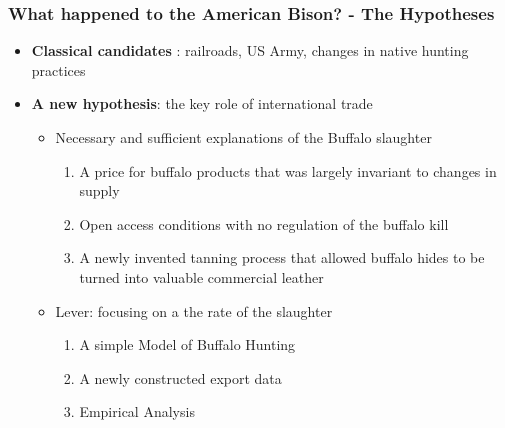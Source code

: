 \documentclass[aspectratio=169, 12pt, final]{beamer}
\begin{document}
\begin{frame}
\frametitle{What happened to the American Bison? - The Hypotheses}	
\begin{itemize}
	\item \textbf{Classical candidates} : railroads, US Army, changes in native hunting practices
\item \textbf{A new hypothesis}: the key role of international trade
\begin{itemize}
	\item Necessary and sufficient explanations of the Buffalo slaughter
	\begin{enumerate}
		\item A price for buffalo products that was largely invariant to changes in supply
		\item Open access conditions with no regulation of the buffalo kill
		\item A newly invented tanning process that allowed buffalo hides to be turned into valuable commercial leather
	\end{enumerate}
	\item Lever: focusing on a the rate of the slaughter
	\begin{enumerate}
		\item A simple Model of Buffalo Hunting
		\item A newly constructed export data
		\item Empirical Analysis 
	\end{enumerate}
\end{itemize}
\end{itemize}
\end{frame}
\end{document}
